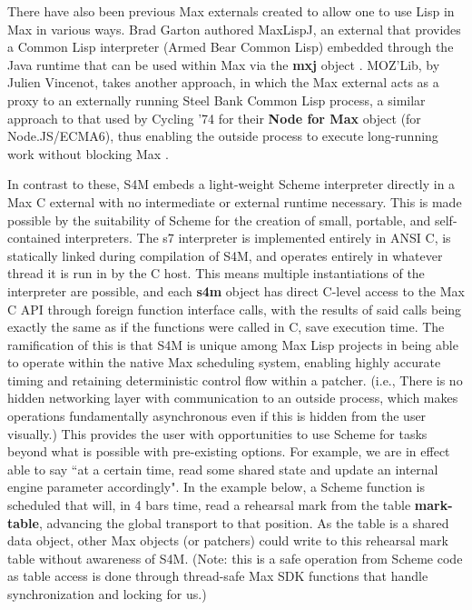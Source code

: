 \documentclass[acmsmall]{acmart}
\begin{document}
There have also been previous Max externals created to allow one to use Lisp in Max in various ways.
Brad Garton authored MaxLispJ, an external that provides a Common Lisp interpreter 
(Armed Bear Common Lisp) embedded through the Java runtime that can be used within Max 
via the \textbf{mxj} object \cite{Garton2011}.
MOZ'Lib, by Julien Vincenot, takes another approach, in which the Max external
acts as a proxy to an externally running Steel Bank Common Lisp process,
a similar approach to that used by Cycling '74 for their \textbf{Node for Max} object (for Node.JS/ECMA6), 
thus enabling the outside process to execute long-running work without blocking Max \cite{Vincenot2017}.

In contrast to these, S4M embeds a light-weight Scheme interpreter directly in a Max
C external with no intermediate or external runtime necessary. This is made possible by the suitability
of Scheme for the creation of small, portable, and self-contained interpreters.
The s7 interpreter is implemented entirely in ANSI C, is statically linked during compilation of S4M, 
and operates entirely in whatever thread it is run in by the C host.
This means multiple instantiations of the interpreter are possible, and
each \textbf{s4m} object has direct C-level access to the Max C API 
through foreign function interface calls, with the results of said calls being exactly 
the same as if the functions were called in C, save execution time. 
The ramification of this is that S4M is unique among Max Lisp projects in being
able to operate within the native Max scheduling system, enabling highly accurate
timing and retaining deterministic control flow within a patcher. (i.e., There
is no hidden networking layer with communication to an outside process, which 
makes operations fundamentally asynchronous even if this is hidden from the user visually.)
This provides the user with opportunities to use Scheme for tasks beyond
what is possible with pre-existing options. For example, we are in effect 
able to say ``at a certain time, read some shared state and update an 
internal engine parameter accordingly". In the example below, a Scheme function
is scheduled that will, in 4 bars time, read a rehearsal mark from the table \textbf{mark-table},
advancing the global transport to that position. As the table
is a shared data object, other Max objects (or patchers) could write to this
rehearsal mark table without awareness of S4M. (Note: this is a safe operation
from Scheme code as table access is done through thread-safe Max SDK functions 
that handle synchronization and locking for us.)
\end{document}
